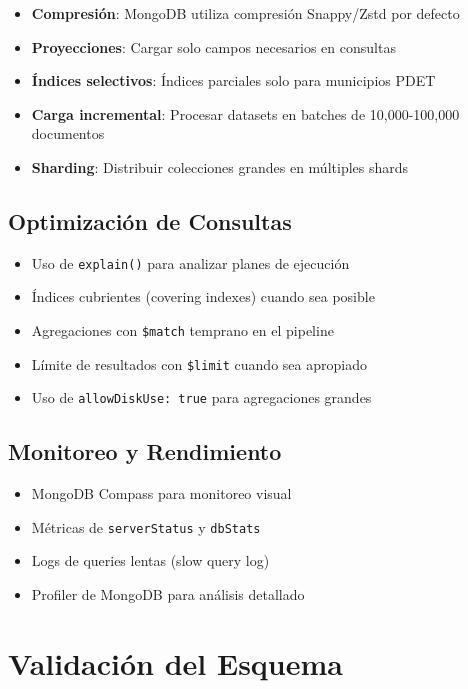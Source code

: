 \documentclass[12pt,a4paper]{article}
\begin{document}
\begin{itemize}[leftmargin=*]
    \item \textbf{Compresión}: MongoDB utiliza compresión Snappy/Zstd por defecto
    \item \textbf{Proyecciones}: Cargar solo campos necesarios en consultas
    \item \textbf{Índices selectivos}: Índices parciales solo para municipios PDET
    \item \textbf{Carga incremental}: Procesar datasets en batches de 10,000-100,000 documentos
    \item \textbf{Sharding}: Distribuir colecciones grandes en múltiples shards
\end{itemize}

\subsection{Optimización de Consultas}

\begin{itemize}[leftmargin=*]
    \item Uso de \texttt{explain()} para analizar planes de ejecución
    \item Índices cubrientes (covering indexes) cuando sea posible
    \item Agregaciones con \texttt{\$match} temprano en el pipeline
    \item Límite de resultados con \texttt{\$limit} cuando sea apropiado
    \item Uso de \texttt{allowDiskUse: true} para agregaciones grandes
\end{itemize}

\subsection{Monitoreo y Rendimiento}

\begin{itemize}[leftmargin=*]
    \item MongoDB Compass para monitoreo visual
    \item Métricas de \texttt{serverStatus} y \texttt{dbStats}
    \item Logs de queries lentas (slow query log)
    \item Profiler de MongoDB para análisis detallado
\end{itemize}

\newpage
\section{Validación del Esquema}
\end{document}
